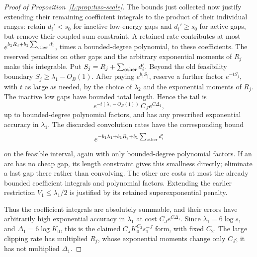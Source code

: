 \documentclass[11pt]{article}
\numberwithin{equation}{section}
\theoremstyle{definition}\newtheorem{definition}[theorem]{Definition}
\theoremstyle{remark}\newtheorem{remark}[theorem]{Remark}
\begin{document}
\begin{proof}[Proof of Proposition~\ref{L:prop:two-scale}]
The bounds just collected now justify extending their remaining
coefficient integrals to the product of their individual ranges: retain
$d_i'<s_0$ for inactive low-energy gaps and $d_i'\ge s_0$ for active
gaps, but remove their coupled sum constraint. A retained rate contributes
at most $e^{b_1R_j+b_1\sum_{\rm other}d_i'}$, times a bounded-degree
polynomial, to these coefficients. The reserved penalties on other
gaps and the arbitrary exponential moments of $R_j$ make this
integrable. Put $S_j=R_j+\sum_{\rm other}d_i'$. Beyond the old feasibility
boundary $S_j\ge\lambda_1-O_B(1)$. After paying $e^{b_1S_j}$,
reserve a further factor $e^{-tS_j}$, with $t$ as large as needed,
by the choice of $\lambda_2$ and the exponential moments of $R_j$.
The inactive low gaps have bounded total length. Hence the tail is
\[
 e^{-t(\lambda_1-O_B(1))}\,C_J e^{C\Delta_1},
\]
up to bounded-degree polynomial factors, and has any prescribed
exponential accuracy in $\lambda_1$. The discarded convolution rates
have the corresponding bound
\[
       e^{-b_1\lambda_1+b_1R_j+b_1\sum_{\rm other}d_i'}
\]
on the feasible interval, again with only bounded-degree polynomial
factors. If an arc has no cheap gap, its length constraint gives this
smallness directly; eliminate a last gap there rather than convolving.
The other arc costs at most the already bounded coefficient integrals
and polynomial factors. Extending the earlier restriction
$V_1\le\lambda_1/2$ is justified by its retained superexponential
penalty.

Thus the coefficient integrals are absolutely summable, and their
errors have arbitrarily high exponential accuracy in $\lambda_1$ at
cost $C_J e^{C\Delta_1}$. Since
$\lambda_1=6\log s_1$ and $\Delta_1=6\log K_0$, this is the claimed
$C_JK_0^{C_2}s_1^{-J}$ form, with fixed $C_2$. The large clipping rate
has multiplied $R_j$, whose exponential moments change only $C_J$;
it has not multiplied $\Delta_1$.


\end{proof}
\end{document}

